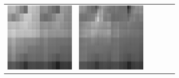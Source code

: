 \documentclass[11pt,a4paper,openright,oneside]{book}
\numberwithin{equation}{section}
\begin{document}
{\begin{figure}[h]
\begin{adjustwidth}{-3cm}{-3cm}
\begin{tabular}{>{\centering\arraybackslash}m{1.5cm} m{2.5cm} m{2.5cm} m{2.5cm} m{2.5cm} m{2.5cm}}
        \includegraphics[width=\linewidth]{media/tnale/AAAfruits-comp3-ale-0.25.png} & 
        \includegraphics[width=\linewidth]{media/tnale/AAAfruits-comp4-ale-0.25.png} &

\end{tabular}
\end{adjustwidth}
\end{figure}}
\end{document}
